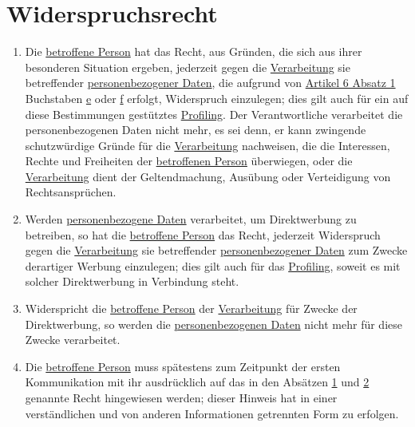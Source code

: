 \chapter{Widerspruchsrecht}
\label{ch:21}


\begin{enumerate}

  \item Die \hyperref[itm:04-1]{betroffene Person} hat das Recht, aus Gründen, die sich aus ihrer besonderen Situation ergeben, jederzeit
   gegen die \hyperref[itm:04-2]{Verarbeitung} sie betreffender \hyperref[itm:04-1]{personenbezogener Daten}, die aufgrund von \hyperref[itm:06-1]{Artikel 6
   Absatz 1} Buchstaben \hyperref[itm:06-1e]{e} oder \hyperref[itm:06-1f]{f} erfolgt, Widerspruch einzulegen; dies gilt
   auch für ein auf diese Bestimmungen gestütztes \hyperref[itm:04-4]{Profiling}. Der Verantwortliche verarbeitet die personenbezogenen
   Daten nicht mehr, es sei denn, er kann zwingende schutzwürdige Gründe für die \hyperref[itm:04-2]{Verarbeitung} nachweisen, die die
   Interessen, Rechte und Freiheiten der \hyperref[itm:04-1]{betroffenen Person} überwiegen, oder die \hyperref[itm:04-2]{Verarbeitung} dient der Geltendmachung,
   Ausübung oder Verteidigung von Rechtsansprüchen.
  \label{itm:21-1}

  \item Werden \hyperref[itm:04-1]{personenbezogene Daten} verarbeitet, um Direktwerbung zu betreiben, so hat die \hyperref[itm:04-1]{betroffene Person} das
   Recht, jederzeit Widerspruch gegen die \hyperref[itm:04-2]{Verarbeitung} sie betreffender \hyperref[itm:04-1]{personenbezogener Daten} zum Zwecke derartiger
   Werbung einzulegen; dies gilt auch für das \hyperref[itm:04-4]{Profiling}, soweit es mit solcher Direktwerbung in Verbindung steht.
  \label{itm:21-2}

  \item Widerspricht die \hyperref[itm:04-1]{betroffene Person} der \hyperref[itm:04-2]{Verarbeitung} für Zwecke der Direktwerbung, so werden die
   \hyperref[itm:04-1]{personenbezogenen Daten} nicht mehr für diese Zwecke verarbeitet.
  \label{itm:21-3}

  \item Die \hyperref[itm:04-1]{betroffene Person} muss spätestens zum Zeitpunkt der ersten Kommunikation mit ihr ausdrücklich auf das in den
   Absätzen \hyperref[itm:21-1]{1} und \hyperref[itm:21-2]{2} genannte Recht hingewiesen werden; dieser Hinweis hat in
   einer verständlichen und von anderen Informationen getrennten Form zu erfolgen.
  \label{itm:21-4}


\end{enumerate}
